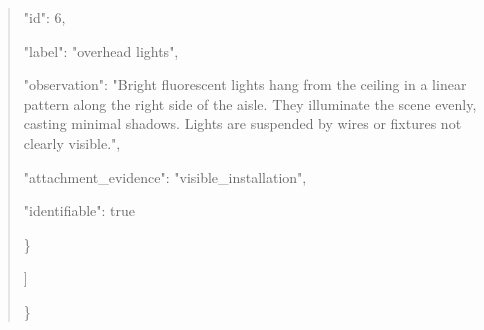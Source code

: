 \documentclass[10pt,a4paper]{article}
\begin{document}
\begin{quote}
      "id":\allowbreak{} 6,\allowbreak{}\par
      "label":\allowbreak{} "overhead lights",\allowbreak{}\par
      "observation":\allowbreak{} "Bright fluorescent lights hang from the ceiling in a linear pattern along the right side of the aisle. They illuminate the scene evenly,\allowbreak{} casting minimal shadows. Lights are suspended by wires or fixtures not clearly visible.",\allowbreak{}\par
      "attachment\_evidence":\allowbreak{} "visible\_installation",\allowbreak{}\par
      "identifiable":\allowbreak{} true\par
    \}\par
  ]\par
\}
\end{quote}
\end{document}
